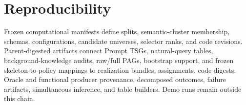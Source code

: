 \section{Reproducibility}

Frozen computational manifests define splits, semantic-cluster membership,
schemas, configurations, candidate universes, selector ranks, and code
revisions. Parent-digested artifacts connect Prompt TSGs, natural-query tables,
background-knowledge audits, raw/full PAGs, bootstrap support, and frozen
skeleton-to-policy mappings to realization bundles, assignments, code digests,
Oracle and functional producer provenance, decomposed outcomes, failure
artifacts, simultaneous inference, and table builders. Demo runs remain
outside this chain.
